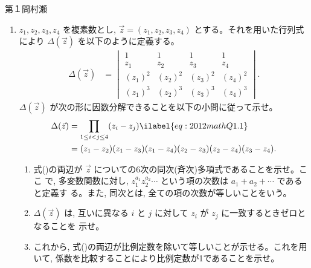 \begin{question}{第１問}{村瀬}
\begin{enumerate}
\item{}
  $z_1,z_2,z_3,z_4$ を複素数とし, $\vec{z}=(z_1,z_2,z_3,z_4)$ とする。それを用いた行列式により $\Delta(\vec{z})$
  を以下のように定義する。
  \begin{align*}
    \Delta(\vec{z})
      &= \begin{vmatrix}
        1 & 1 & 1 & 1\\
        z_1 & z_2 & z_3 & z_4\\
        (z_1)^2 & (z_2)^2 & (z_3)^2 & (z_4)^2\\
        (z_1)^3 & (z_2)^3 & (z_3)^3 & (z_4)^3
      \end{vmatrix}.
  \end{align*}
  $\Delta(\vec{z})$ が次の形に因数分解できることを以下の小問に従って示せ。
  \begin{align}
    \Delta(\vec{z})
      &= \prod_{1\le i<j\le 4} (z_i - z_j) \ilabel{eq:2012mathQ1.1}\\
      &= (z_1-z_2)(z_1-z_3)(z_1-z_4)(z_2-z_3)(z_2-z_4)(z_3-z_4). \nonumber
  \end{align}

  \begin{enumerate}
  \item
    式()の両辺が $\vec{z}$ についての6次の同次(斉次)多項式であることを示せ。ここ
    で, 多変数関数に対し, $z_1^{a_1}z_2^{a_2}\cdots$ という項の次数は $a_1+a_2+\cdots$ であると定義す
    る。また, 同次とは, 全ての項の次数が等しいことをいう。
  \item
    $\Delta(\vec{z})$ は, 互いに異なる $i$ と $j$ に対して $z_i$ が $z_j$ に一致するときゼロとなることを
    示せ。
  \item
    これから, 式()の両辺が比例定数を除いて等しいことが示せる。これを用いて, 
    係数を比較することにより比例定数が1であることを示せ。
  \end{enumerate}


\end{enumerate}
\end{question}
